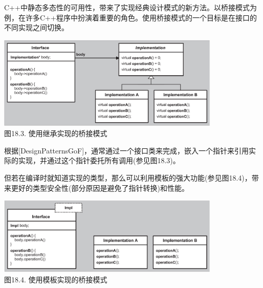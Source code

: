 C++中静态多态性的可用性，带来了实现经典设计模式的新方法。以桥接模式为例，在许多C++程序中扮演着重要的角色。使用桥接模式的一个目标是在接口的不同实现之间切换。

\begin{center}
\includegraphics[width=0.8\textwidth]{content/3/chapter18/images/3.png} \\
图18.3. 使用继承实现的桥接模式
\end{center}

根据[DesignPatternsGoF]，通常通过一个接口类来完成，嵌入一个指针来引用实际的实现，并通过这个指针委托所有调用(参见图18.3)。

但若在编译时就知道实现的类型，那么可以利用模板的强大功能(参见图18.4)，带来更好的类型安全性(部分原因是避免了指针转换)和性能。

\begin{center}
\includegraphics[width=0.8\textwidth]{content/3/chapter18/images/4.png} \\
图18.4. 使用模板实现的桥接模式
\end{center}










































